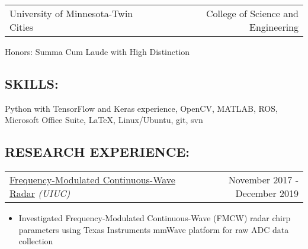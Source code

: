 \documentclass[10pt, letterpaper]{article}
\makeatletter
\newcommand{\headerrow}[2]
{\begin{tabular*}{\linewidth}{l@{\extracolsep{\fill}}r}
	#1 &
	#2 \\
\end{tabular*}}
\newcommand{\sansserif}{\cabin}
\makeatother
\begin{document}

\headerrow
	{University of Minnesota-Twin Cities}
	{College of Science and Engineering}

Honors: Summa Cum Laude with High Distinction

\subsection*{\sansserif SKILLS:}
Python with TensorFlow and Keras experience, OpenCV, MATLAB, ROS, 
	Microsoft Office Suite, \LaTeX, Linux/Ubuntu, git, svn

\begin{comment}
\subsection*{\sansserif RESEARCH INTERESTS:}
\begin{itemize}
	\item Efficient sensor fusion, particularly for autonomous vehicles
	\item Real-time video tracking and segmentation
	\item Intuitive exploitation of sequential nature of videos for perception tasks
\end{itemize}
\end{comment}


\subsection*{\sansserif RESEARCH EXPERIENCE:}

\headerrow
    {\uline{Frequency-Modulated Continuous-Wave Radar} \textit{(UIUC)}}
    {November 2017 - December 2019}
    \begin{itemize}
	\begin{comment}
        \item
        Worked with Professor Minh Do to develop fusion algorithms to generate
		high resolution depth maps from radar, video, and egomotion data for autonomous vehicle applications
	\end{comment}
	\item 
		Investigated Frequency-Modulated Continuous-Wave (FMCW) radar
		    chirp parameters using Texas Instruments mmWave platform for
		    raw ADC data collection 
    \end{itemize}
\end{document}
